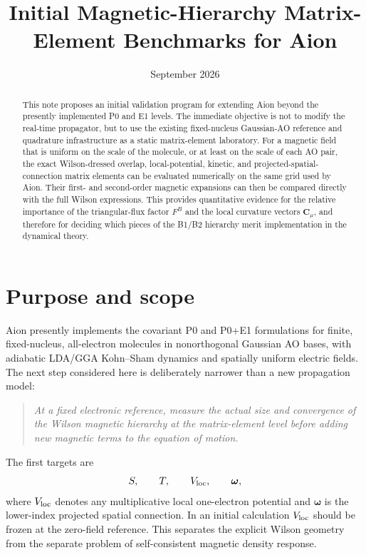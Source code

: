 \documentclass[11pt]{article}
\title{Initial Magnetic-Hierarchy Matrix-Element Benchmarks for Aion}
\author{}
\date{September 2026}
\newcommand{\vect}[1]{\bm{#1}}
\begin{document}
\maketitle

\begin{abstract}
This note proposes an initial validation program for extending Aion beyond the presently implemented P0 and E1 levels.  The immediate objective is not to modify the real-time propagator, but to use the existing fixed-nucleus Gaussian-AO reference and quadrature infrastructure as a static matrix-element laboratory.  For a magnetic field that is uniform on the scale of the molecule, or at least on the scale of each AO pair, the exact Wilson-dressed overlap, local-potential, kinetic, and projected-spatial-connection matrix elements can be evaluated numerically on the same grid used by Aion.  Their first- and second-order magnetic expansions can then be compared directly with the full Wilson expressions.  This provides quantitative evidence for the relative importance of the triangular-flux factor $F^B$ and the local curvature vectors $\vect C_\mu$, and therefore for deciding which pieces of the B1/B2 hierarchy merit implementation in the dynamical theory.
\end{abstract}

\section{Purpose and scope}

Aion presently implements the covariant P0 and P0+E1 formulations for finite, fixed-nucleus, all-electron molecules in nonorthogonal Gaussian AO bases, with adiabatic LDA/GGA Kohn--Sham dynamics and spatially uniform electric fields.  The next step considered here is deliberately narrower than a new propagation model:

\begin{quote}
\emph{At a fixed electronic reference, measure the actual size and convergence of the Wilson magnetic hierarchy at the matrix-element level before adding new magnetic terms to the equation of motion.}
\end{quote}

The first targets are
\begin{equation}
S,\qquad T,\qquad V_{\rm loc},\qquad \vect\omega,
\end{equation}
where $V_{\rm loc}$ denotes any multiplicative local one-electron potential and $\vect\omega$ is the lower-index projected spatial connection.  In an initial calculation $V_{\rm loc}$ should be frozen at the zero-field reference.  This separates the explicit Wilson geometry from the separate problem of self-consistent magnetic density response.
\end{document}
